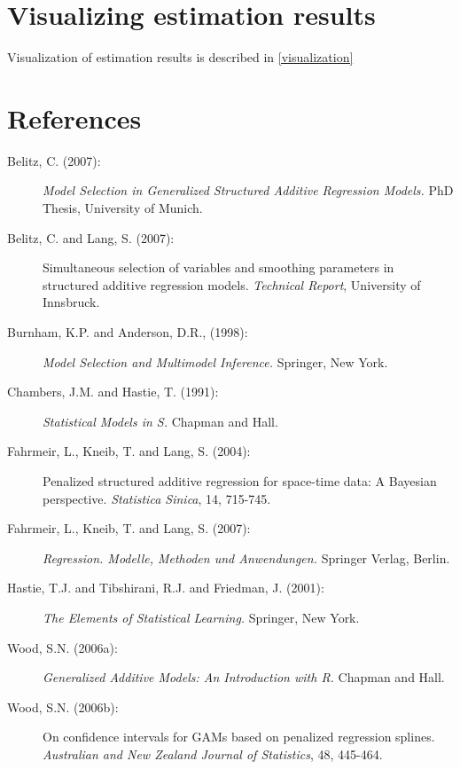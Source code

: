 \section{Visualizing estimation results}

Visualization of estimation results is described in
\autoref{visualization}

\section{References}
\label{stepwiseregreferences}

\begin{description}
\item[Belitz, C. (2007):] {\it Model Selection in Generalized Structured Additive Regression Models.} PhD Thesis, University of Munich.

\item [Belitz, C. and Lang, S. (2007):] Simultaneous selection of variables and smoothing
parameters in structured additive regression models. {\it Technical Report}, University of Innsbruck.

\item[Burnham, K.P. and Anderson, D.R., (1998):] {\it Model Selection and Multimodel Inference.} Springer, New York.

\item[Chambers, J.M. and Hastie, T. (1991):] {\it Statistical Models in S.} Chapman and Hall.

\item[Fahrmeir, L., Kneib, T. and Lang, S. (2004):] Penalized
structured additive regression for space-time data: A Bayesian
perspective. {\it Statistica Sinica}, 14, 715-745.

\item[Fahrmeir, L., Kneib, T. and Lang, S. (2007):] {\it Regression. Modelle, Methoden und Anwendungen.} Springer Verlag, Berlin.

\item[Hastie, T.J. and Tibshirani, R.J. and Friedman, J. (2001):] {\it The Elements of Statistical Learning.} Springer, New York.

\item[Wood, S.N. (2006a):] {\it Generalized Additive Models: An Introduction with R.} Chapman and Hall.

\item[Wood, S.N. (2006b):] On confidence intervals for GAMs based on penalized regression splines.
{\it Australian and New Zealand Journal of Statistics}, 48, 445-464.
\end{description}
